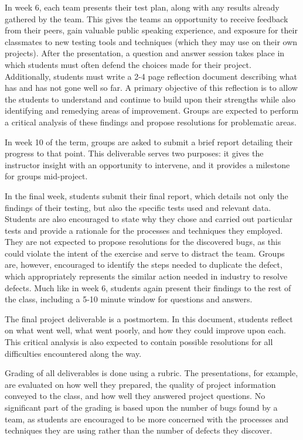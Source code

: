 \documentclass{sig-alternate}
\begin{document}
In week 6, each team presents their test plan, along with any results already gathered by the team. This gives the teams an opportunity to receive feedback from their peers, gain valuable public speaking experience, and exposure for their classmates to new testing tools and techniques (which they may use on their own projects). After the presentation, a question and answer session takes place in which students must often defend the choices made for their project. Additionally, students must write a 2-4 page reflection document describing what has and has not gone well so far. A primary objective of this reflection is to allow the students to understand and continue to build upon their strengths while also identifying and remedying areas of improvement. Groups are expected to perform a critical analysis of these findings and propose resolutions for problematic areas.

In week 10 of the term, groups are asked to submit a brief report detailing their progress to that point. This deliverable serves two purposes: it gives the instructor insight with an opportunity to intervene, and it provides a milestone for groups mid-project.

In the final week, students submit their final report, which details not only the findings of their testing, but also the specific tests used and relevant data. Students are also encouraged to state why they chose and carried out particular tests and provide a rationale for the processes and techniques they employed. They are not expected to propose resolutions for the discovered bugs, as this could violate the intent of the exercise and serve to distract the team. Groups are, however, encouraged to identify the steps needed to duplicate the defect, which appropriately represents the similar action needed in industry to resolve defects. Much like in week 6, students again present their findings to the rest of the class, including a 5-10 minute window for questions and answers.

The final project deliverable is a postmortem. In this document, students reflect on what went well, what went poorly, and how they could improve upon each. This critical analysis is also expected to contain possible resolutions for all difficulties encountered along the way.

Grading of all deliverables is done using a rubric. The presentations, for example, are evaluated on how well they prepared, the quality of project information conveyed to the class, and how well they answered project questions. No significant part of the grading is based upon the number of bugs found by a team, as students are encouraged to be more concerned with the processes and techniques they are using rather than the number of defects they discover.
\end{document}
